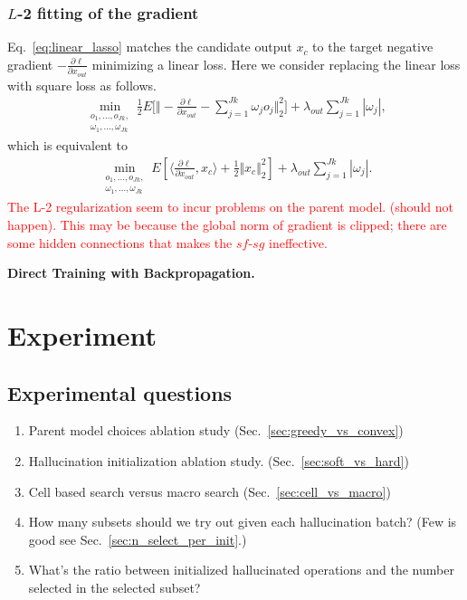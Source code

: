\documentclass{article}
\newcommand{\todo}[1]{\textcolor{red}{#1}}
\begin{document}
\subsubsection{$L$-2 fitting of the gradient}
Eq.~\ref{eq:linear_lasso} matches the candidate output $x_c$ to the target negative gradient $-\frac{\partial \ell}{\partial x_{out}}$ minimizing a linear loss. Here we consider replacing the linear loss with square loss as follows.
\begin{align}
\min _{
    \substack{o_1,...,o_{Jk}, \\ \omega_1,..., \omega_{Jk}}
    } 
    \frac{1}{2}E \big[ 
     \Vert 
        - \frac{\partial \ell}{\partial x_{out}} - 
        \sum _{j = 1}^{Jk} \omega_j o_j
    \Vert^2_2 \big] 
    + \lambda_{out} \sum _{j = 1}^{Jk} | \omega_j |, 
\end{align}
which is equivalent to 
\begin{align}
\label{eq:quadratic_lasso}
\min _{
    \substack{o_1,...,o_{Jk}, \\ \omega_1,..., \omega_{Jk}}
    } 
    E [\langle 
        \frac{\partial \ell}{\partial x_{out}} , 
        x_c
    \rangle 
    + \frac{1}{2} \Vert x_c \Vert^2_2] 
    + \lambda_{out} \sum _{j = 1}^{Jk} | \omega_j |.
\end{align}
\todo{The L-2 regularization seem to incur problems on the parent model. (should not happen). This may be because the global norm of gradient is clipped; there are some hidden connections that makes the $sf$-$sg$ ineffective.  }


\textbf{Direct Training with Backpropagation.}





    
\section{Experiment}

\subsection{Experimental questions}
\begin{enumerate}
\item Parent model choices ablation study (Sec.~\ref{sec:greedy_vs_convex})
\item Hallucination initialization ablation study. (Sec.~\ref{sec:soft_vs_hard})
\item Cell based search versus macro search (Sec.~\ref{sec:cell_vs_macro})
\item How many subsets should we try out given each hallucination batch? (Few is good see Sec.~\ref{sec:n_select_per_init}.)
\item What's the ratio between initialized hallucinated operations and the number selected in the selected subset?
    
\end{enumerate}
\end{document}
